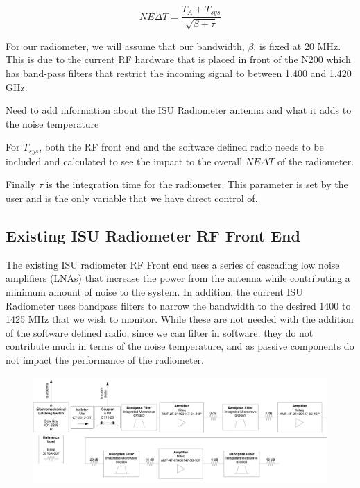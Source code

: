 \begin{equation}
NE\Delta T=\frac{T_{A}+T_{sys}}{\sqrt{\beta + \tau}}
\end{equation}

For our radiometer, we will assume that our bandwidth, $\beta$, is fixed at 20 MHz.  This is due to the current RF hardware that is placed in front of the N200 which has band-pass filters that restrict the incoming signal to between 1.400 and 1.420 GHz. 

Need to add information about the ISU Radiometer antenna and what it adds to the noise temperature

For $T_{sys}$, both the RF front end and the software defined radio needs to be included and calculated to see the impact to the overall $NE\Delta T$ of the radiometer.  

Finally $\tau$ is the integration time for the radiometer.  This parameter is set by the user and is the only variable that we have direct control of.  

\subsection{Existing ISU Radiometer RF Front End}

The existing ISU radiometer RF Front end uses a series of cascading low noise amplifiers (LNAs) that increase the power from the antenna while contributing a minimum amount of noise to the system.  In addition, the current ISU Radiometer uses bandpass filters to narrow the bandwidth to the desired 1400 to 1425 MHz that we wish to monitor.  While these are not needed with the addition of the software defined radio, since we can filter in software, they do not contribute much in terms of the noise temperature, and as passive components do not impact the performance of the radiometer.

{\begin{figure}[h!tb] 
\centering
\includegraphics[width=17cm]{Images/ISU_rf_block.png}
\label{ISU_rf_block}
\end{figure}
}

